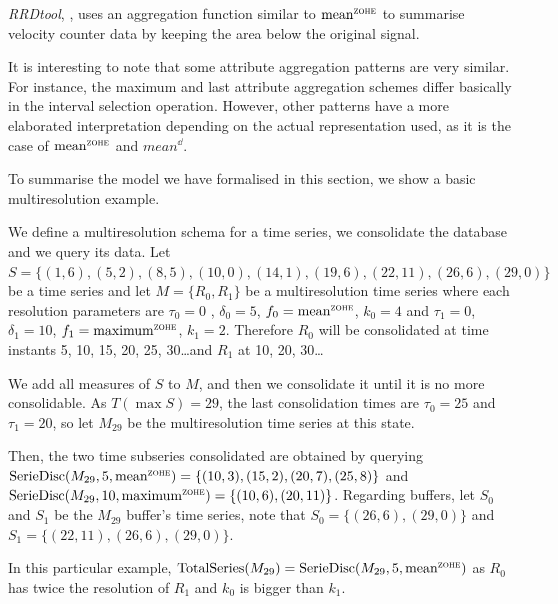 \emph{RRDtool}, \cite{rrdtool}, uses an aggregation function similar
to $\meanz$ to summarise velocity counter data by keeping the area
below the original signal.

It is interesting to note that some attribute aggregation patterns are
very similar. For instance, the maximum and last attribute aggregation
schemes differ basically in the interval selection operation. However,
other patterns have a more elaborated interpretation depending on the
actual representation used, as it is the case of $\meanz$ and
$mean^\dd$.


To summarise the model we have formalised in this section, we show a
basic multiresolution example.
\begin{example}\label{ex:model:smultiresolution}
  We define a multiresolution schema for a time series, we consolidate
  the database and we query its data.  Let $S =
  \{(1,6),(5,2),\allowbreak (8,5),\allowbreak (10,0),\allowbreak
  (14,1),\allowbreak (19,6),\allowbreak (22,11),\allowbreak
  (26,6),(29,0) \}$ be a time series and let $M=\{R_0,R_1\}$ be a
  multiresolution time series where each resolution parameters are
  $\tau_0=0$ , $\delta_0=5$, $f_0 =\meanz$, $k_0=4$ and $\tau_1=0$,
  $\delta_1=10$, $f_1 =\maxz$, $k_1=2$. Therefore $R_0$ will be
  consolidated at time instants 5, 10, 15, 20, 25, 30\dots and $R_1$
  at 10, 20, 30\dots

  We add all measures of $S$ to $M$, and then we consolidate it until
  it is no more consolidable. As $T(\max S)=29$, the last
  consolidation times are $\tau_0=25$ and $\tau_1=20$, so let $M_{29}$
  be the multiresolution time series at this state.

  Then, the two time subseries consolidated are obtained by querying
  $\seriedisc(M_{29},5,\meanz) = \{(10,3), (15,2), (20,7), (25,8)\}$
  and $\seriedisc(M_{29}, 10,\allowbreak \maxz) = \{(10,6),
  (20,11)\}$. Regarding buffers, let $S_0$ and $S_1$ be the $M_{29}$
  buffer's time series, note that $S_0= \{(26,6), (29,0)\}$ and
  $S_1=\{(22,11), (26,6), (29,0)\}$.

  In this particular example, $ \totalseries(M_{29}) =
  \seriedisc(M_{29}, 5, \meanz)$ as $R_0$ has twice the
  resolution of $R_1$ and $k_0$ is bigger than $k_1$.
\end{example}


